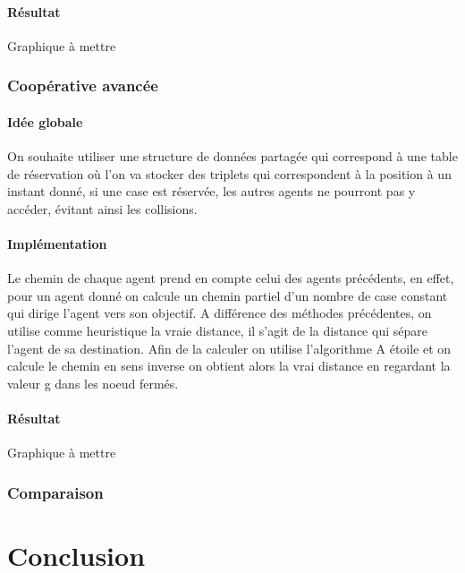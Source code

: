 \documentclass{article}
\begin{document}
			\subsection{Résultat}
			Graphique à mettre
		
		\section{Coopérative avancée}

			\subsection{Idée globale}
			On souhaite utiliser une structure de données partagée qui correspond à une table de réservation où l'on va stocker des triplets qui correspondent à la position à un instant donné, si une case est réservée, les autres agents ne pourront pas y accéder, évitant ainsi les collisions.

			\subsection{Implémentation}
			Le chemin de chaque agent prend en compte celui des agents précédents, en effet, pour un agent donné on calcule un chemin partiel d'un nombre de case constant qui dirige l'agent vers son objectif. A différence des méthodes précédentes, on utilise comme heuristique la vraie distance, il s'agit de la distance qui sépare l'agent de sa destination. Afin de la calculer on utilise l'algorithme A étoile et on calcule le chemin en sens inverse on obtient alors la vrai distance en regardant la valeur g dans les noeud fermés.
			
			\subsection{Résultat}
			Graphique à mettre
					
		\section{Comparaison}
	
	\part{Conclusion}
		
\end{document}

